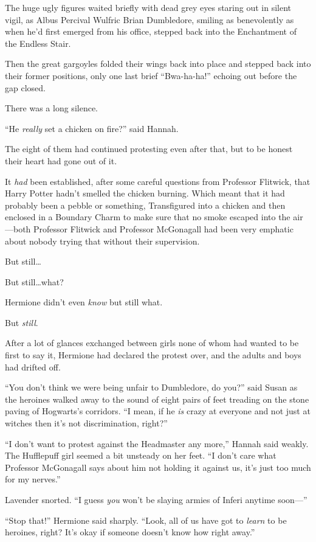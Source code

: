 The huge ugly figures waited briefly with dead grey eyes staring out in silent vigil, as Albus Percival Wulfric Brian Dumbledore, smiling as benevolently as when he’d first emerged from his office, stepped back into the Enchantment of the Endless Stair.

Then the great gargoyles folded their wings back into place and stepped back into their former positions, only one last brief “Bwa-ha-ha!” echoing out before the gap closed.

There was a long silence.

“He \emph{really} set a chicken on fire?” said Hannah.

\later

The eight of them had continued protesting even after that, but to be honest their heart had gone out of it.

It \emph{had} been established, after some careful questions from Professor Flitwick, that Harry Potter hadn’t smelled the chicken burning. Which meant that it had probably been a pebble or something, Transfigured into a chicken and then enclosed in a Boundary Charm to make sure that no smoke escaped into the air—both Professor Flitwick and Professor McGonagall had been very emphatic about nobody trying that without their supervision.

But still…

But still…what?

Hermione didn’t even \emph{know} but still what.

But \emph{still}.

After a lot of glances exchanged between girls none of whom had wanted to be first to say it, Hermione had declared the protest over, and the adults and boys had drifted off.

“You don’t think we were being unfair to Dumbledore, do you?” said Susan as the heroines walked away to the sound of eight pairs of feet treading on the stone paving of Hogwarts’s corridors. “I mean, if he \emph{is} crazy at everyone and not just at witches then it’s not discrimination, right?”

“I don’t want to protest against the Headmaster any more,” Hannah said weakly. The Hufflepuff girl seemed a bit unsteady on her feet. “I don’t care what Professor McGonagall says about him not holding it against us, it’s just too much for my nerves.”

Lavender snorted. “I guess \emph{you} won’t be slaying armies of Inferi anytime soon—”

“Stop that!” Hermione said sharply. “Look, all of us have got to \emph{learn} to be heroines, right? It’s okay if someone doesn’t know how right away.”

